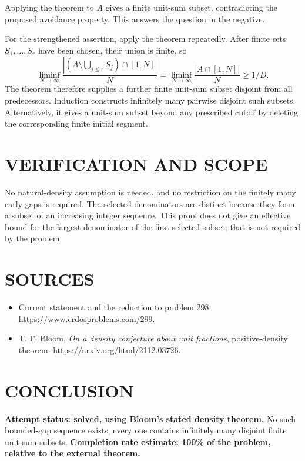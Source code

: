 Applying the theorem to $A$ gives a finite unit-sum subset, contradicting the proposed avoidance property. This answers the question in the negative.

For the strengthened assertion, apply the theorem repeatedly. After finite sets $S_1,\ldots,S_r$ have been chosen, their union is finite, so
\[
\liminf_{N\to\infty}\frac{|(A\setminus\bigcup_{j\leq r}S_j)\cap[1,N]|}{N}
=\liminf_{N\to\infty}\frac{|A\cap[1,N]|}{N}\geq1/D.
\]
The theorem therefore supplies a further finite unit-sum subset disjoint from all predecessors. Induction constructs infinitely many pairwise disjoint such subsets. Alternatively, it gives a unit-sum subset beyond any prescribed cutoff by deleting the corresponding finite initial segment.

\section{VERIFICATION AND SCOPE}
No natural-density assumption is needed, and no restriction on the finitely many early gaps is required. The selected denominators are distinct because they form a subset of an increasing integer sequence. This proof does not give an effective bound for the largest denominator of the first selected subset; that is not required by the problem.

\section{SOURCES}
\begin{itemize}
\item Current statement and the reduction to problem 298: \url{https://www.erdosproblems.com/299}.
\item T. F. Bloom, \emph{On a density conjecture about unit fractions}, positive-density theorem: \url{https://arxiv.org/html/2112.03726}.
\end{itemize}
\section{CONCLUSION}
\textbf{Attempt status: solved, using Bloom's stated density theorem.}
No such bounded-gap sequence exists; every one contains infinitely many disjoint finite unit-sum subsets.
\textbf{Completion rate estimate: 100\% of the problem, relative to the external theorem.}
